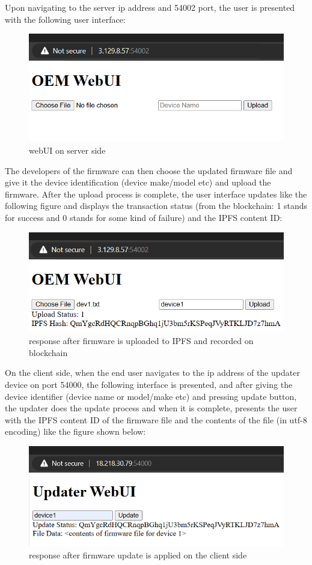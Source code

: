 \documentclass{article}
\begin{document}
Upon navigating to the server ip address and 54002 port, the user is presented with the following user interface:
\begin{figure}[H]
    \centering
    \includegraphics[width=\textwidth]{webui.png}
    \caption{webUI on server side}
\end{figure}
The developers of the firmware can then choose the updated firmware file and give it the device identification (device make/model etc) and upload the firmware. After the upload process is complete, the user interface updates like the following figure and displays the transaction status (from the blockchain: 1 stands for success and 0 stands for some kind of failure) and the IPFS content ID:
\begin{figure}[H]
    \centering
    \includegraphics[width=\textwidth]{response.png}
    \caption{response after firmware is uploaded to IPFS and recorded on blockchain}
\end{figure}

On the client side, when the end user navigates to the ip address of the updater device on port 54000, the following interface is presented, and after giving the device identifier (device name or model/make etc) and pressing update button, the updater does the update process and when it is complete, presents the user with the IPFS content ID of the firmware file and the contents of the file (in utf-8 encoding) like the figure shown below:
\begin{figure}[H]
    \centering
    \includegraphics[width=\textwidth]{updaterResponse.png}
    \caption{response after firmware update is applied on the client side}
\end{figure}
\end{document}
